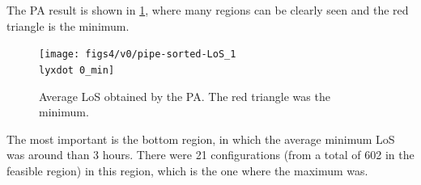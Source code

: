 \documentclass[11pt]{article} %
\begin{document}
The PA result is shown in \ref{subfig:pipe17-1}, where many regions
can be clearly seen and the red triangle is the minimum.
\begin{figure}[H]
\noindent \begin{centering}
\texttt{[image: figs4/v0/pipe-sorted-LoS\_1\\lyxdot 0\_min]}
\par\end{centering}

\caption{Average LoS obtained by the PA. The red triangle was the minimum.
\label{subfig:pipe17-1}}
\end{figure}
 The most important is the bottom region, in which the average minimum
LoS was around than 3 hours. There were 21 configurations (from a
total of 602 in the feasible region) in this region, which is the
one where the maximum was.
\end{document}
